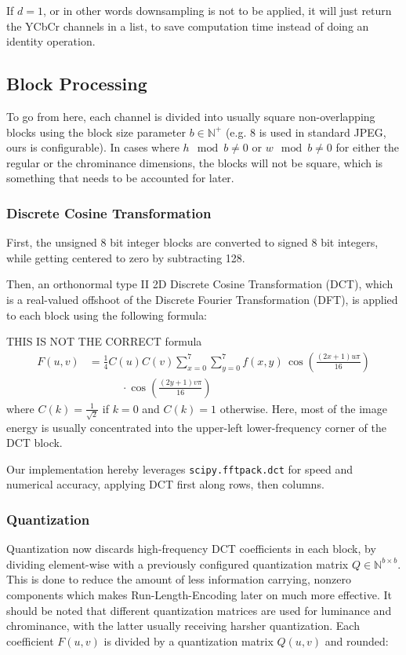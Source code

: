 If \(d = 1\), or in other words downsampling is not to be applied, it will just return the YCbCr channels in a list, to save computation time instead of doing an identity operation.


\subsection{Block Processing}
To go from here, each channel is divided into usually square non-overlapping blocks using the block size parameter \(b \in \mathbb{N}^+\) (e.g. 8 is used in standard JPEG, ours is configurable). In cases where \(h \mod b \neq 0\) or \(w \mod b \neq 0\) for either the regular or the chrominance dimensions, the blocks will not be square, which is something that needs to be accounted for later. 

\subsubsection{Discrete Cosine Transformation}
First, the unsigned 8 bit integer blocks are converted to signed 8 bit integers, while getting centered to zero by subtracting 128.

Then, an orthonormal type II 2D Discrete Cosine Transformation (DCT), which is a real-valued offshoot of the Discrete Fourier Transformation (DFT), is applied to each block using the following formula:

THIS IS NOT THE CORRECT formula
\begin{align}
  F(u, v) &= \frac{1}{4} C(u)C(v) \sum_{x=0}^{7} \sum_{y=0}^{7} f(x,y) \,
  \cos\left( \frac{(2x+1)u\pi}{16} \right) \nonumber \\
  &\hspace{3em} \cdot \cos\left( \frac{(2y+1)v\pi}{16} \right)
\end{align}
where $C(k) = \frac{1}{\sqrt{2}}$ if $k = 0$ and $C(k) = 1$ otherwise. Here, most of the image energy is usually concentrated into the upper-left lower-frequency corner of the DCT block.

Our implementation hereby leverages \texttt{scipy.fftpack.dct} for speed and numerical accuracy, applying DCT first along rows, then columns.
\subsubsection{Quantization}
Quantization now discards high-frequency DCT coefficients in each block, by dividing element-wise with a previously configured quantization matrix $Q \in \mathbb{N}^{b\times b}$. This is done to reduce the amount of less information carrying, nonzero components which makes Run-Length-Encoding later on much more effective. It should be noted that different quantization matrices are used for luminance and chrominance, with the latter usually receiving harsher quantization. Each coefficient $F(u,v)$ is divided by a quantization matrix $Q(u,v)$ and rounded:

